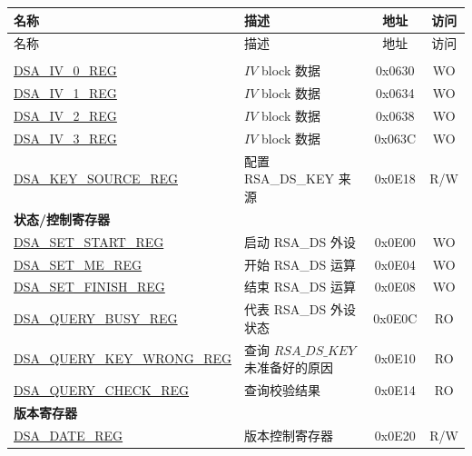 


\newif\ifdigsiglatest
\iftagged{ESP32-P4-latest}{\digsiglatesttrue}{\digsiglatestfalse}
\begin{longtable}{ | p{5.2cm} | p{6.6cm} | c| c| }
\hline\rowcolor{lightgray}
名称 & 描述 &  地址 & 访问 \\ \hline
\endfirsthead
        \hline
        \rowcolor{lightgray}
名称 & 描述 &  地址 & 访问 \\ \hline

        \endhead
        \endfoot
\multicolumn{4}{|l|}{\textbf{配置寄存器}} \\ \hline
\hyperref[regdesc:DSAIVREG]{DSA\_IV\_0\_REG}               & \begin{math}IV\end{math} block 数据         & 0x0630 & WO \\ \hline
\hyperref[regdesc:DSAIVREG]{DSA\_IV\_1\_REG}               & \begin{math}IV\end{math} block 数据          & 0x0634 & WO \\ \hline
\hyperref[regdesc:DSAIVREG]{DSA\_IV\_2\_REG}               & \begin{math}IV\end{math} block 数据          & 0x0638 & WO \\ \hline
\hyperref[regdesc:DSAIVREG]{DSA\_IV\_3\_REG}               & \begin{math}IV\end{math} block 数据           & 0x063C & WO \\ \hline
\ifdigsiglatest
\hyperref[regdesc:DSAKEYSOURCEREG]{DSA\_KEY\_SOURCE\_REG} & 配置 RSA\_DS\_KEY 来源 & 0x0E18 & R/W \\\hline
\fi
\multicolumn{4}{|l|}{\textbf{状态/控制寄存器}} \\ \hline
\hyperref[regdesc:DSASETSTARTREG]{DSA\_SET\_START\_REG}               & 启动 RSA\_DS 外设     & 0x0E00 & WO \\ \hline
\hyperref[regdesc:DSASETMEREG]{DSA\_SET\_ME\_REG}                     & 开始 RSA\_DS 运算       & 0x0E04 & WO \\ \hline
\hyperref[regdesc:DSASETFINISHREG]{DSA\_SET\_FINISH\_REG}             & 结束 RSA\_DS 运算         & 0x0E08 & WO \\ \hline
\hyperref[regdesc:DSAQUERYBUSYREG]{DSA\_QUERY\_BUSY\_REG}             & 代表 RSA\_DS 外设状态& 0x0E0C & RO \\ \hline
\hyperref[regdesc:DSAQUERYKEYWRONGREG]{DSA\_QUERY\_KEY\_WRONG\_REG}   & 查询 \begin{math}RSA\_DS\_KEY\end{math} 未准备好的原因       & 0x0E10 & RO \\ \hline
\hyperref[regdesc:DSAQUERYCHECKREG]{DSA\_QUERY\_CHECK\_REG}           & 查询校验结果    & 0x0E14 & RO \\ \hline
\multicolumn{4}{|l|}{\textbf{版本寄存器}} \\ \hline
\hyperref[regdesc:DSADATEREG]{DSA\_DATE\_REG}                   & 版本控制寄存器   & 0x0E20 & R/W \\ \hline
\end{longtable}
